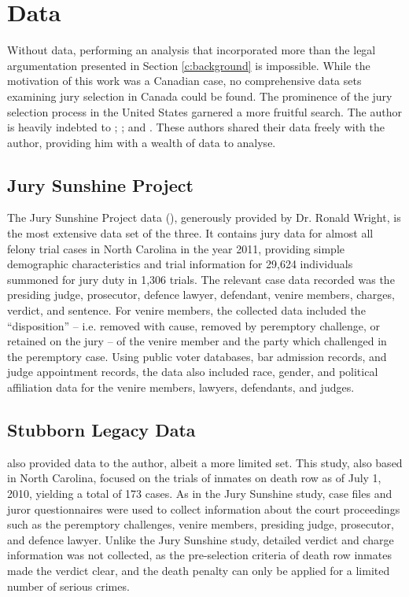 \section{Data} \label{c:data}

Without data, performing an analysis that incorporated more than the
legal argumentation presented in Section \ref{c:background} is impossible. While the motivation of this work was a Canadian case, no comprehensive
data sets examining jury selection in Canada could be found. The prominence of the jury selection process
in the United States garnered a more fruitful search. The author is heavily indebted to \citeauthor{JurySunshineProj}; \citeauthor{StubbornLegacy}; and
\citeauthor{PerempChalMurder}. These authors shared their data freely with the author, providing him with a wealth of data to
analyse.

\subsection{Jury Sunshine Project} \label{sec:jspdata}

The Jury Sunshine Project data (\cite{JurySunshineProj}), generously provided by Dr. Ronald Wright, is the most extensive data set of the three. It
contains jury data for almost all felony trial cases in North Carolina in the year 2011, providing simple demographic
characteristics and trial information for 29,624 individuals summoned
for jury duty in 1,306 trials. The relevant case data recorded was the presiding judge, prosecutor, defence lawyer, defendant, venire members,
charges, verdict, and sentence. For venire members, the collected data included the ``disposition'' -- i.e. removed with cause, removed by peremptory challenge, or retained on the jury -- of the venire member and the party which challenged in the peremptory case. Using public voter databases, bar admission records, and judge appointment records, the data also included race, gender, and political
affiliation data for the venire members, lawyers, defendants, and judges.

\subsection{Stubborn Legacy Data} \label{sec:norcardata}

\cite{StubbornLegacy} also provided data to the author, albeit a more limited set. This study, also based in North Carolina,
focused on the trials of inmates on death row as of July 1, 2010, yielding a total of 173 cases. As in the Jury Sunshine study, case files and juror questionnaires were used to collect information about the court proceedings such as the peremptory challenges, venire members, presiding judge, prosecutor, and defence lawyer. Unlike the Jury Sunshine study, detailed verdict and charge information was not collected, as the pre-selection criteria of death row inmates made the verdict clear, and the death penalty can only be applied for a limited number of serious crimes.

